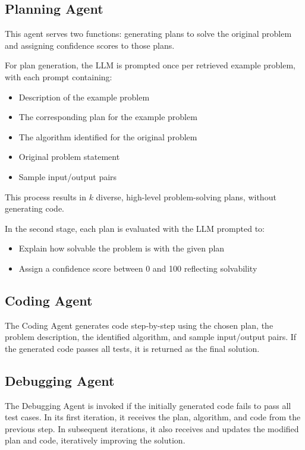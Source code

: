 \documentclass[11pt,a4paper]{article}
\begin{document}
\subsection{Planning Agent}
This agent serves two functions: generating plans to solve the original problem and assigning confidence scores to those plans.

For plan generation, the LLM is prompted once per retrieved example problem, with each prompt containing:
\begin{itemize}
  \item Description of the example problem
  \item The corresponding plan for the example problem
  \item The algorithm identified for the original problem
  \item Original problem statement
  \item Sample input/output pairs
\end{itemize}

This process results in $k$ diverse, high-level problem-solving plans, without generating code.

In the second stage, each plan is evaluated with the LLM prompted to:
\begin{itemize}
  \item Explain how solvable the problem is with the given plan
  \item Assign a confidence score between 0 and 100 reflecting solvability
\end{itemize}

\subsection{Coding Agent}
The Coding Agent generates code step-by-step using the chosen plan, the problem description, the identified algorithm, and sample input/output pairs. If the generated code passes all tests, it is returned as the final solution.

\subsection{Debugging Agent}
The Debugging Agent is invoked if the initially generated code fails to pass all test cases. In its first iteration, it receives the plan, algorithm, and code from the previous step. In subsequent iterations, it also receives and updates the modified plan and code, iteratively improving the solution.
\end{document}
